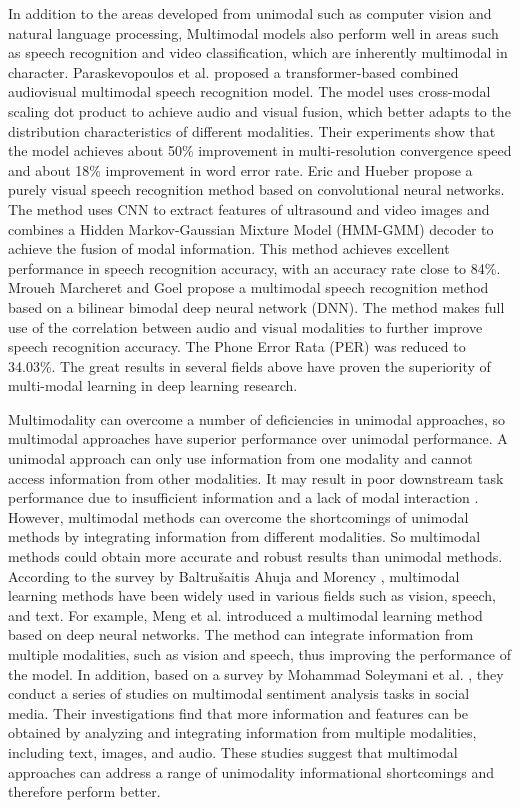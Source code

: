 \documentclass{ecai}
\begin{document}
 In addition to the areas developed from unimodal such as computer vision and natural language processing, Multimodal models also perform well in areas such as speech recognition and video classification, which are inherently multimodal in character.
 Paraskevopoulos et al. \cite{paraskevopoulos_multiresolution_2020} proposed a transformer-based combined audiovisual multimodal speech recognition model. The model uses cross-modal scaling dot product to achieve audio and visual fusion, which better adapts to the distribution characteristics of different modalities. Their experiments show that the model achieves about 50\% improvement in multi-resolution convergence speed and about 18\% improvement in word error rate. Eric and Hueber \cite{tatulli_feature_2017} propose a purely visual speech recognition method based on convolutional neural networks. The method uses CNN to extract features of ultrasound and video images and combines a Hidden Markov-Gaussian Mixture Model (HMM-GMM) decoder to achieve the fusion of modal information. This method achieves excellent performance in speech recognition accuracy, with an accuracy rate close to 84\%. Mroueh Marcheret and Goel \cite{mroueh_deep_2015} propose a multimodal speech recognition method based on a bilinear bimodal deep neural network (DNN). The method makes full use of the correlation between audio and visual modalities to further improve speech recognition accuracy. The Phone Error Rata (PER) was reduced to 34.03\%. The great results in several fields above have proven the superiority of multi-modal learning in deep learning research.

Multimodality can overcome a number of deficiencies in unimodal approaches, so multimodal approaches have superior performance over unimodal performance. A unimodal approach can only use information from one modality and cannot access information from other modalities. It may result in poor downstream task performance due to insufficient information and a lack of modal interaction \cite{lappe_cortical_2008} \cite{liang_expanding_2022} \cite{chen_cross-modal_2022}. However, multimodal methods can overcome the shortcomings of unimodal methods by integrating information from different modalities. So multimodal methods could obtain more accurate and robust results than unimodal methods. According to the survey by Baltrušaitis Ahuja and Morency \cite{baltrusaitis_multimodal_2019}, multimodal learning methods have been widely used in various fields such as vision, speech, and text. For example, Meng et al.  \cite{meng_depression_2013} introduced a multimodal learning method based on deep neural networks. The method can integrate information from multiple modalities, such as vision and speech, thus improving the performance of the model. In addition, based on a survey by Mohammad Soleymani et al. \cite{soleymani_survey_2017}, they conduct a series of studies on multimodal sentiment analysis tasks in social media. Their investigations find that more information and features can be obtained by analyzing and integrating information from multiple modalities, including text, images, and audio. These studies suggest that multimodal approaches can address a range of unimodality informational shortcomings and therefore perform better.
 
\end{document}
